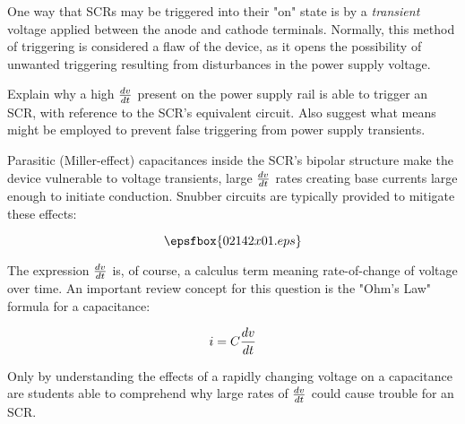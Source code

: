 

One way that SCRs may be triggered into their "on" state is by a {\it transient} voltage applied between the anode and cathode terminals.  Normally, this method of triggering is considered a flaw of the device, as it opens the possibility of unwanted triggering resulting from disturbances in the power supply voltage.

Explain why a high ${dv \over dt}$ present on the power supply rail is able to trigger an SCR, with reference to the SCR's equivalent circuit.  Also suggest what means might be employed to prevent false triggering from power supply transients.







Parasitic (Miller-effect) capacitances inside the SCR's bipolar structure make the device vulnerable to voltage transients, large ${dv \over dt}$ rates creating base currents large enough to initiate conduction.  Snubber circuits are typically provided to mitigate these effects:

$$\epsfbox{02142x01.eps}$$







The expression ${dv \over dt}$ is, of course, a calculus term meaning rate-of-change of voltage over time.  An important review concept for this question is the "Ohm's Law" formula for a capacitance:

$$i = C {dv \over dt}$$

Only by understanding the effects of a rapidly changing voltage on a capacitance are students able to comprehend why large rates of ${dv \over dt}$ could cause trouble for an SCR.




